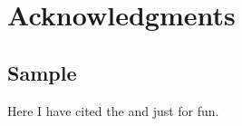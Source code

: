 \documentclass[../main.tex]{subfiles}
\begin{document}
	
	\chapter{Acknowledgments}
	
	\section{Sample}
	
	Here I have cited the \cite{adxl} and \cite{kiburz1986bicycle} just for fun.
\end{document}
